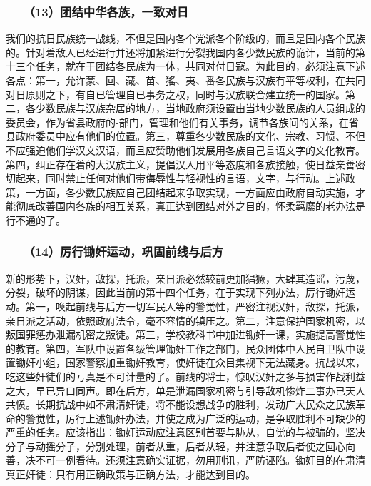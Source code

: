 \documentclass[cn,11pt,chinese]{elegantbook}
\def\myformat#1{\hfil\hfil #1}
\begin{document}
\subsubsection*{\myformat{　　（13）团结中华各族，一致对日}}
我们的抗日民族统一战线，不但是国内各个党派各个阶级的，而且是国内各个民族的。针对着敌人已经进行并还将加紧进行分裂我国内各少数民族的诡计，当前的第十三个任务，就在于团结各民族为一体，共同对付日寇。为此目的，必须注意下述各点：第一，允许蒙、回、藏、苗、猺、夷、番各民族与汉族有平等权利，在共同对日原则之下，有自已管理自已事务之权，同时与汉族联合建立统一的国家。第二，各少数民族与汉族杂居的地方，当地政府须设置由当地少数民族的人员组成的委员会，作为省县政府的-部门，管理和他们有关事务，调节各族间的关系，在省县政府委员中应有他们的位置。第三，尊重各少数民族的文化、宗教、习惯、不但不应强迫他们学汉文汉语，而且应赞助他们发展用各族自己言语文字的文化教育。第四，纠正存在着的大汉族主义，提倡汉人用平等态度和各族接触，使日益亲善密切起来，同时禁止任何对他们带侮辱性与轻视性的言语，文字，与行动。上述政策，一方面，各少数民族应自己团结起来争取实现，一方面应由政府自动实施，才能彻底改善国内各族的相互关系，真正达到团结对外之目的，怀柔羁縻的老办法是行不通的了。\\
\subsubsection*{\myformat{　　（14）厉行锄奸运动，巩固前线与后方}}
新的形势下，汉奸，敌探，托派，亲日派必然较前更加猖獗，大肆其造谣，污蔑，分裂，破坏的阴谋，因此当前的第十四个任务，在于实现下列办法，厉行锄奸运动。第一，唤起前线与后方一切军民人等的警觉性，严密注视汉奸，敌探，托派，亲日派之活动，依照政府法令，毫不容情的镇压之。第二，注意保护国家机密，以叛国罪惩办泄漏机密之叛徒。第三，学校教科书中加进锄奸一课，实施提高警觉性的教育。第四，军队中设置各级管理锄奸工作之部门，民众团体中人民自卫队中设置锄奸小组，国家警察加重锄奸教育，使奸徒在众目集视下无法藏身。抗战以来，吃这些奸徒们的亏真是不可计量的了。前线的将士，惊叹汉奸之多与损害作战利益之大，早已异口同声。即在后方，单是泄漏国家机密与引导敌机惨炸二事办已天人共愤。长期抗战中如不肃清奸徒，将不能设想战争的胜利，发动广大民众之民族革命的警觉性，厉行上述锄奸办法，并使之成为广泛的运动，是争取胜利不可缺少的严重的任务。应该指出：锄奸运动应注意区别首要与胁从，自觉的与被骗的，坚决分子与动摇分子，分别处理，前者从重，后者从轻，并注意争取后者使之回心向善，决不可一例看待。还须注意确实证据，勿用刑讯，严防诬陷。锄奸目的在肃清真正奸徒：只有用正确政策与正确方法，才能达到目的。\\
\end{document}
